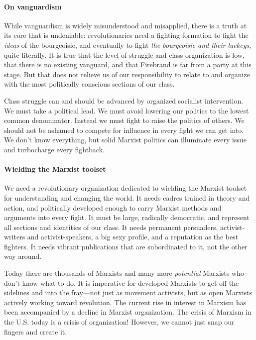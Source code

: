 \paragraph{On vanguardism}

While vanguardism is widely misunderstood and misapplied, there is a truth at its core that is undeniable: revolutionaries need a fighting formation to fight the \emph{ideas} of the bourgeoisie, and eventually to fight \emph{the bourgeoisie and their lackeys}, quite literally. It is true that the level of struggle and class organization is low, that there is no existing vanguard, and that Firebrand is far from a party at this stage. But that does not relieve us of our responsibility to relate to and organize with the most politically conscious sections of our class.

Class struggle can and should be advanced by organized socialist intervention. We must take a political lead. We must avoid lowering our politics to the lowest common denominator. Instead we must fight to raise the politics of others. We should not be ashamed to compete for influence in every fight we can get into. We don't know everything, but solid Marxist politics can illuminate every issue and turbocharge every fightback.

\paragraph{Wielding the Marxist toolset}

We need a revolutionary organization dedicated to wielding the Marxist toolset for understanding and changing the world. It needs cadres trained in theory and action, and politically developed enough to carry Marxist methods and arguments into every fight. It must be large, radically democratic, and represent all sections and identities of our class. It needs permanent persuaders, activist-writers and activist-speakers, a big sexy profile, and a reputation as the best fighters. It needs vibrant publications that are subordinated to it, not the other way around.

Today there are thousands of Marxists and many more \emph{potential} Marxists who don't know what to do. It is imperative for developed Marxists to get off the sidelines and into the fray---not just as movement activists, but as open Marxists actively working toward revolution. The current rise in interest in Marxism has been accompanied by a decline in Marxist organization. The crisis of Marxism in the U.S. today is a crisis of organization! However, we cannot just snap our fingers and create it.

